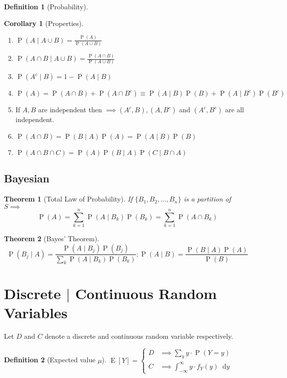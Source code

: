 \documentclass[fontsize=12pt]{article}
\newcommand{\set}[1]{\{#1\}}
\newcommand{\pr}[1]{\operatorname{P}(#1)}
\newcommand{\expt}[1]{\operatorname{E}[#1]}
\newcommand*\diff{\mathop{}\!\mathrm{d}}
\newcommand{\intv}[4]{\int_{#3}^{#4} #1 \diff #2}
\newtheorem*{theorem}{Theorem}
\newtheorem*{definition}{Definition}
\newtheorem*{corollary}{Corollary}
\begin{document}
\begin{definition}[Probability]
    
\end{definition}

\begin{corollary}[Properties]\end{corollary}
\begin{enumerate}[label=(\roman*)]
    \item $\pr{A \mid A\cup B} = \frac{\pr{A}}{\pr{A \cup B}}$
    \item $\pr{A\cap B \mid A\cup B} = \frac{\pr{A \cap B}}{\pr{A \cup B}}$
    \item $\pr{A^c \mid B} = 1 - \pr{A \mid B}$
    \item $\pr{A} = \pr{A \cap B} + \pr{A \cap B^c} \equiv \pr{A\mid B}\pr{B} + \pr{A\mid B^c}\pr{B^c}$
    \item If $A,B$ are independent then $\implies (A^c, B), (A, B^c)$ and $(A^c, B^c)$ are all independent.
    \item $\pr{A\cap B} = \pr{B \mid A}\pr{A} = \pr{A \mid B}\pr{B} $
    \item $\pr{A \cap B \cap C} = \pr{A}\pr{B\mid A}\pr{C \mid B\cap A}$
\end{enumerate}

\subsection{Bayesian}
\begin{theorem}[Total Law of Probability]
    If $\set{B_1, B_2, \ldots, B_n}$ is a partition of $S \implies $ \[
        \pr{A} = \sum_{k=1}^{n}\pr{A \mid B_k}\pr{B_k} = \sum_{k=1}^{n}\pr{A \cap B_k}
    \]
\end{theorem}


\begin{theorem}[Bayes' Theorem] \[
    \pr{B_j \mid A} = 
    \frac{\pr{A \mid B_j}\pr{B_j}}{\sum\limits_{k}\pr{A \mid B_k}\pr{B_k}};
    \pr{A\mid B} = \frac{\pr{B \mid A}\pr{A}}{\pr{B}}
\]
\end{theorem}



\section{Discrete $\big\vert$ Continuous Random Variables}
Let $D$ and $C$ denote a discrete and continuous random variable respectively.

\begin{definition}[Expected value $\mu$]
$\expt{Y} = \begin{cases}
    D &\implies \sum_{y}y\cdot \pr{Y=y}\\
    C & \implies \intv{y\cdot f_Y(y)}{y}{-\infty}{\infty}
\end{cases}$
\end{definition}
\end{document}

